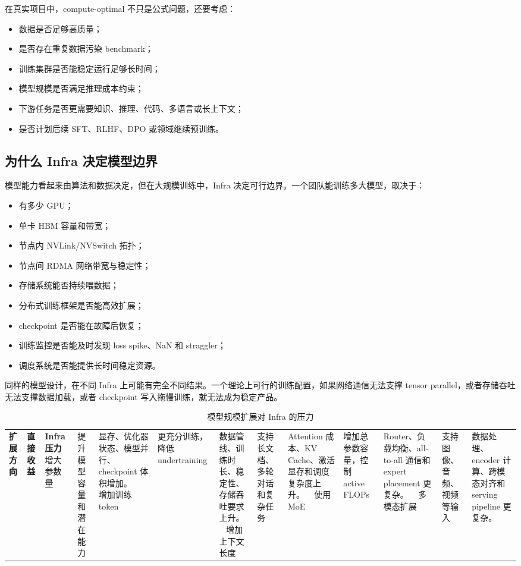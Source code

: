 在真实项目中，compute-optimal 不只是公式问题，还要考虑：

\begin{itemize}
\item 数据是否足够高质量；
\item 是否存在重复数据污染 benchmark；
\item 训练集群是否能稳定运行足够长时间；
\item 模型规模是否满足推理成本约束；
\item 下游任务是否更需要知识、推理、代码、多语言或长上下文；
\item 是否计划后续 SFT、RLHF、DPO 或领域继续预训练。
\end{itemize}

\subsection{为什么 Infra 决定模型边界}
\label{subsec:why-infra-defines-model-boundary}

模型能力看起来由算法和数据决定，但在大规模训练中，Infra 决定可行边界。一个团队能训练多大模型，取决于：

\begin{itemize}
\item 有多少 GPU；
\item 单卡 HBM 容量和带宽；
\item 节点内 NVLink/NVSwitch 拓扑；
\item 节点间 RDMA 网络带宽与稳定性；
\item 存储系统能否持续喂数据；
\item 分布式训练框架是否能高效扩展；
\item checkpoint 是否能在故障后恢复；
\item 训练监控是否能及时发现 loss spike、NaN 和 straggler；
\item 调度系统是否能提供长时间稳定资源。
\end{itemize}

同样的模型设计，在不同 Infra 上可能有完全不同结果。一个理论上可行的训练配置，如果网络通信无法支撑 tensor parallel，或者存储吞吐无法支撑数据加载，或者 checkpoint 写入拖慢训练，就无法成为稳定产品。

\begin{table}[H]
\centering
\small
\caption{模型规模扩展对 Infra 的压力}
\label{tab:model-scaling-infra-pressure}
\begin{tabular}{p{}p{}p{}}
\toprule
\textbf{扩展方向} & \textbf{直接收益} & \textbf{Infra 压力} \
\midrule
增大参数量
& 提升模型容量和潜在能力
& 显存、优化器状态、模型并行、checkpoint 体积增加。 \
\midrule
增加训练 token
& 更充分训练，降低 undertraining
& 数据管线、训练时长、稳定性、存储吞吐要求上升。 \
\midrule
增加上下文长度
& 支持长文档、多轮对话和复杂任务
& Attention 成本、KV Cache、激活显存和调度复杂度上升。 \
\midrule
使用 MoE
& 增加总参数容量，控制 active FLOPs
& Router、负载均衡、all-to-all 通信和 expert placement 更复杂。 \
\midrule
多模态扩展
& 支持图像、音频、视频等输入
& 数据处理、encoder 计算、跨模态对齐和 serving pipeline 更复杂。 \
\bottomrule
\end{tabular}
\end{table}

